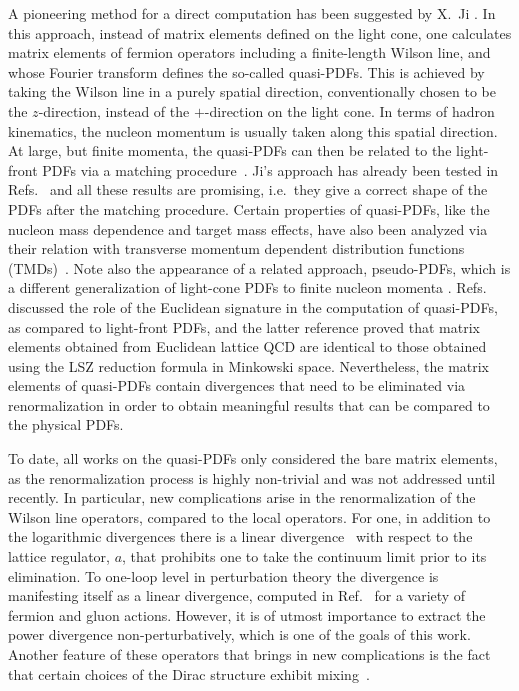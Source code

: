 \documentclass[12pt,tighten,nofootinbib,amssymb,floatfix]{article}
\begin{document}
\medskip
A pioneering method for a direct computation has been suggested by X.~Ji \cite{Ji:2013dva}.
In this approach, instead of matrix elements defined on the light cone, one calculates matrix elements 
of fermion operators including a finite-length Wilson line, and whose Fourier transform defines the so-called 
quasi-PDFs. This is achieved by taking the Wilson line in a purely spatial direction, conventionally chosen 
to be the $z$-direction, instead of the $+$-direction on the light cone.
In terms of hadron kinematics, the nucleon momentum is usually taken along this spatial direction. 
At large, but finite momenta, the quasi-PDFs can then be related to the light-front 
PDFs via a matching procedure~\cite{Xiong:2013bka,Chen:2016fxx}. Ji's approach has already been tested in 
Refs.~\cite{Lin:2014zya,Gamberg:2014zwa,Alexandrou:2015rja,Chen:2016utp,Alexandrou:2016jqi} and all these results 
are promising, i.e.\ they give a correct shape of the PDFs after the matching procedure. Certain properties of quasi-PDFs, 
like the nucleon mass dependence and target mass effects, have also been analyzed via their relation with transverse momentum 
dependent distribution functions (TMDs)~\cite{Radyushkin:2017ffo,Radyushkin:2016hsy}. 
Note also the appearance of a related approach, pseudo-PDFs, which is a different generalization of light-cone PDFs to finite nucleon momenta \cite{Radyushkin:2017cyf,Orginos:2017kos}.
Refs.~\cite{Carlson:2017gpk,Briceno:2017cpo} discussed the role of the Euclidean signature in the computation of quasi-PDFs, as compared to light-front PDFs, and the latter reference proved that matrix elements obtained from Euclidean lattice QCD are identical to those obtained using the LSZ reduction formula in Minkowski space. 
Nevertheless, the matrix elements of quasi-PDFs contain divergences that need to be eliminated via renormalization in order to obtain 
meaningful results that can be compared to the physical PDFs.

\medskip
To date, all works on the quasi-PDFs only considered the bare matrix elements, as the renormalization process is
highly non-trivial and was not addressed until recently. In particular, new complications arise in the 
renormalization of the Wilson line operators, compared to the local operators. For one, in addition to the 
logarithmic divergences there is a linear divergence~\cite{Dotsenko:1979wR} with respect to the lattice regulator, 
$a$, that prohibits one to take the continuum limit prior to its elimination. To one-loop level in perturbation theory the 
divergence is manifesting itself as a linear divergence, computed in Ref.~\cite{Constantinou:2017sej} for a variety 
of fermion and gluon actions. However, it is of utmost importance to extract the power divergence non-perturbatively, 
which is one of the goals of this work.  Another feature of these operators that brings in new complications is the fact 
that certain choices of the Dirac structure exhibit mixing~\cite{Constantinou:2017sej}.
\end{document}
